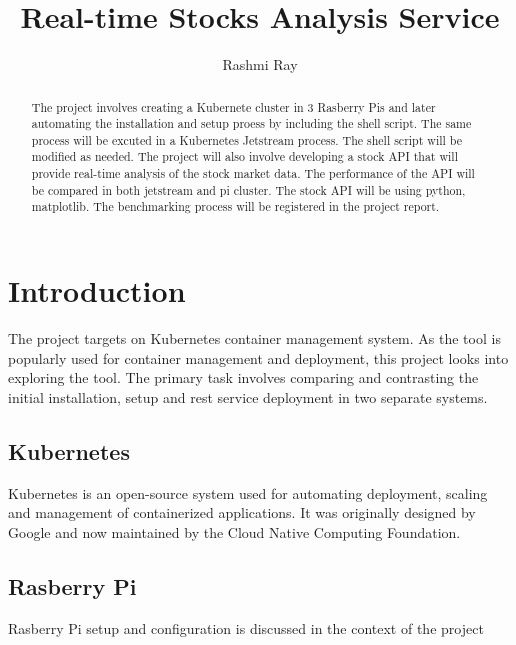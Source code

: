 
\title{Real-time Stocks Analysis Service}

\author{Rashmi Ray}

\renewcommand{\shortauthors}{Uma Kugan}
\begin{abstract}
The project involves creating a Kubernete cluster in 3 Rasberry Pis and later 
automating the installation and setup proess by including the shell script.
The same process will be excuted in a Kubernetes Jetstream process. The shell
script will be modified as needed. The project will also involve developing a stock 
API that will provide real-time analysis of the stock market data. The performance
of the API will be compared in both jetstream and pi cluster. The stock API will 
be using python, matplotlib. The benchmarking process will be registered in the project report.
\end{abstract}



\maketitle

\section{Introduction}
The project targets on Kubernetes container management system. As the tool is popularly used
for container management and deployment, this project looks into exploring the tool.
The primary task involves comparing and contrasting the initial installation, 
setup and rest service deployment in two separate systems.  



\subsection{Kubernetes}
Kubernetes is an open-source system used for automating deployment, 
scaling and management of containerized applications. It was originally 
designed by Google and now maintained by the Cloud Native Computing 
Foundation.\cite{hid-sp18-417-kubernetes}

\subsection{Rasberry Pi}
Rasberry Pi setup and configuration is discussed in the context of the project

